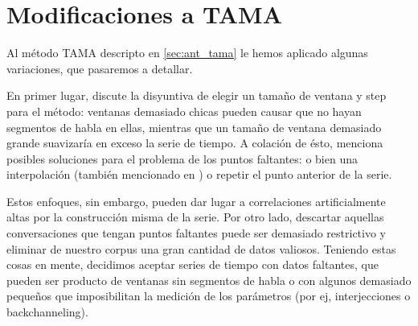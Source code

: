 \section{Modificaciones a TAMA}
\label{sec:tama_modifications}
Al método TAMA descripto en \ref{sec:ant_tama} le hemos aplicado algunas variaciones, que pasaremos a detallar.

En primer lugar, \cite{KOU2008.2} discute la disyuntiva de elegir un tamaño de ventana y step para el método: ventanas demasiado chicas pueden causar que no hayan segmentos de habla en ellas, mientras que un tamaño de ventana demasiado grande suavizaría en exceso la serie de tiempo. A colación de ésto, menciona posibles soluciones para el problema de los puntos faltantes: o bien una interpolación (también mencionado en \cite{DEL2013}) o repetir el punto anterior de la serie.

Estos enfoques, sin embargo, pueden dar lugar a correlaciones artificialmente altas por la construcción misma de la serie. Por otro lado, descartar aquellas conversaciones que tengan puntos faltantes puede ser demasiado restrictivo y eliminar de nuestro corpus una gran cantidad de datos valiosos. Teniendo estas cosas en mente, decidimos aceptar series de tiempo con datos faltantes, que pueden ser producto de ventanas sin segmentos de habla o con algunos demasiado pequeños que imposibilitan la medición de los parámetros (por ej, interjecciones o backchanneling).



